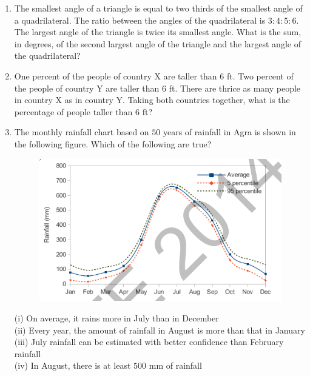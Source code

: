 \documentclass[a4paper,10pt]{article}
\begin{document}
\begin{enumerate}
    \item The smallest angle of a triangle is equal to two thirds of the smallest angle of a quadrilateral. The ratio between the angles of the quadrilateral is $3:4:5:6$. The largest angle of the triangle is twice its smallest angle. What is the sum, in degrees, of the second largest angle of the triangle and the largest angle of the quadrilateral?
    
    \hfill{}

    \item One percent of the people of country X are taller than $6$ ft. Two percent of the people of country Y are taller than $6$ ft. There are thrice as many people in country X as in country Y. Taking both countries together, what is the percentage of people taller than $6$ ft?
    
    \hfill{}
    \begin{enumerate}
    \end{enumerate}

    \item The monthly rainfall chart based on $50$ years of rainfall in Agra is shown in the following figure. Which of the following are true? 
    \begin{figure}[H]
        \centering 
        \includegraphics[width=0.7\columnwidth]{GAq10.png} \caption*{} 
        \label{fig:q10} 
    \end{figure}
    (i) On average, it rains more in July than in December \\
    (ii) Every year, the amount of rainfall in August is more than that in January \\
    (iii) July rainfall can be estimated with better confidence than February rainfall \\
    (iv) In August, there is at least $500$ mm of rainfall
    

\end{enumerate}
\end{document}
